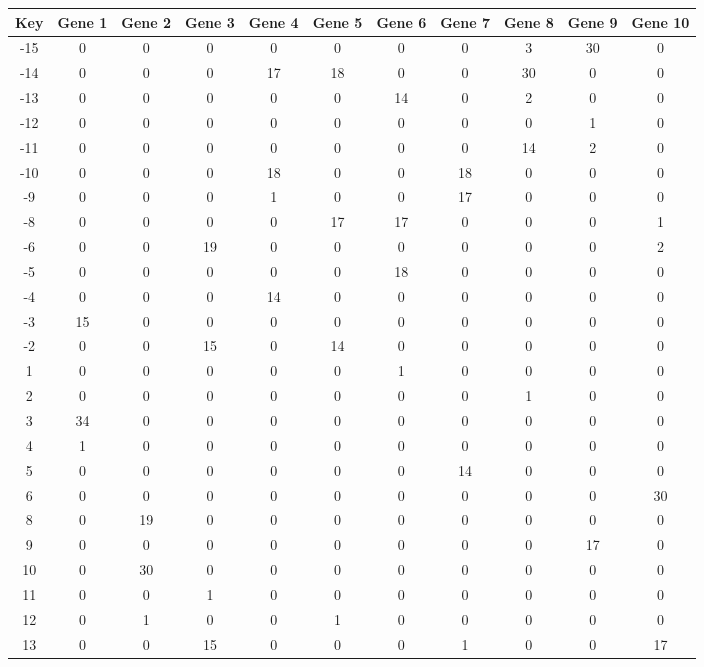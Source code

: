 \begin{tabular}{|c|c|c|c|c|c|c|c|c|c|c|}
\hline
Key & Gene 1 & Gene 2 & Gene 3 & Gene 4 & Gene 5 & Gene 6 & Gene 7 & Gene 8 & Gene 9 & Gene 10 \\
\hline
-15 & 0 & 0 & 0 & 0 & 0 & 0 & 0 & 3 & 30 & 0 \\
-14 & 0 & 0 & 0 & 17 & 18 & 0 & 0 & 30 & 0 & 0 \\
-13 & 0 & 0 & 0 & 0 & 0 & 14 & 0 & 2 & 0 & 0 \\
-12 & 0 & 0 & 0 & 0 & 0 & 0 & 0 & 0 & 1 & 0 \\
-11 & 0 & 0 & 0 & 0 & 0 & 0 & 0 & 14 & 2 & 0 \\
-10 & 0 & 0 & 0 & 18 & 0 & 0 & 18 & 0 & 0 & 0 \\
-9 & 0 & 0 & 0 & 1 & 0 & 0 & 17 & 0 & 0 & 0 \\
-8 & 0 & 0 & 0 & 0 & 17 & 17 & 0 & 0 & 0 & 1 \\
-6 & 0 & 0 & 19 & 0 & 0 & 0 & 0 & 0 & 0 & 2 \\
-5 & 0 & 0 & 0 & 0 & 0 & 18 & 0 & 0 & 0 & 0 \\
-4 & 0 & 0 & 0 & 14 & 0 & 0 & 0 & 0 & 0 & 0 \\
-3 & 15 & 0 & 0 & 0 & 0 & 0 & 0 & 0 & 0 & 0 \\
-2 & 0 & 0 & 15 & 0 & 14 & 0 & 0 & 0 & 0 & 0 \\
1 & 0 & 0 & 0 & 0 & 0 & 1 & 0 & 0 & 0 & 0 \\
2 & 0 & 0 & 0 & 0 & 0 & 0 & 0 & 1 & 0 & 0 \\
3 & 34 & 0 & 0 & 0 & 0 & 0 & 0 & 0 & 0 & 0 \\
4 & 1 & 0 & 0 & 0 & 0 & 0 & 0 & 0 & 0 & 0 \\
5 & 0 & 0 & 0 & 0 & 0 & 0 & 14 & 0 & 0 & 0 \\
6 & 0 & 0 & 0 & 0 & 0 & 0 & 0 & 0 & 0 & 30 \\
8 & 0 & 19 & 0 & 0 & 0 & 0 & 0 & 0 & 0 & 0 \\
9 & 0 & 0 & 0 & 0 & 0 & 0 & 0 & 0 & 17 & 0 \\
10 & 0 & 30 & 0 & 0 & 0 & 0 & 0 & 0 & 0 & 0 \\
11 & 0 & 0 & 1 & 0 & 0 & 0 & 0 & 0 & 0 & 0 \\
12 & 0 & 1 & 0 & 0 & 1 & 0 & 0 & 0 & 0 & 0 \\
13 & 0 & 0 & 15 & 0 & 0 & 0 & 1 & 0 & 0 & 17 \\
\hline
\end{tabular}